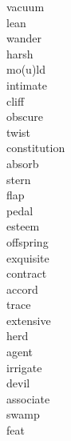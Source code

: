 \documentclass[b5paper, 11pt]{ctexart}
\begin{document}
\begin{multicols*}{3}
\begin{description}
\item[vacuum]

\item[lean]

\item[wander]

\item[harsh]

\item[mo(u)ld]

\item[intimate]

\item[cliff]

\item[obscure]

\item[twist]

\item[constitution]

\item[absorb]

\item[stern]

\item[flap]

\item[pedal]

\item[esteem]

\item[offspring]

\item[exquisite]

\item[contract]

\item[accord]

\item[trace]

\item[extensive]

\item[herd]

\item[agent]

\item[irrigate]

\item[devil]

\item[associate]

\item[swamp]

\item[feat]


\end{description}
\end{multicols*}
\end{document}
